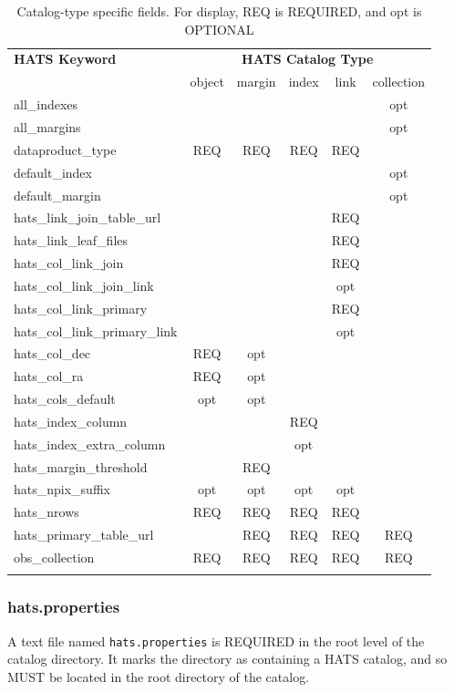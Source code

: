\documentclass[11pt,a4paper]{ivoa}
\begin{document}
\begin{table}[h!]
{\footnotesize\begin{tabular}{l c c c c c}
\sptablerule
\textbf{HATS Keyword} &\multicolumn{5}{c}{\textbf{HATS Catalog Type}} \\
\rowcolor{white}
& object & margin & index & link & collection \\
\sptablerule
all\_indexes & & & & &opt \\
all\_margins & & & & &opt \\
dataproduct\_type &REQ &REQ &REQ &REQ & \\
default\_index & & & & &opt \\
default\_margin & & & & &opt \\
hats\_link\_join\_table\_url & & & &REQ & \\
hats\_link\_leaf\_files & & & &REQ & \\
hats\_col\_link\_join & & & &REQ & \\
hats\_col\_link\_join\_link & & & &opt & \\
hats\_col\_link\_primary & & & &REQ & \\
hats\_col\_link\_primary\_link & & & &opt & \\
hats\_col\_dec &REQ &opt & & & \\
hats\_col\_ra &REQ &opt & & & \\
hats\_cols\_default &opt &opt & & & \\
hats\_index\_column & & &REQ & & \\
hats\_index\_extra\_column & & &opt & & \\
hats\_margin\_threshold & &REQ & & & \\
hats\_npix\_suffix &opt &opt &opt &opt & \\
hats\_nrows &REQ &REQ &REQ &REQ & \\
hats\_primary\_table\_url & &REQ &REQ &REQ &REQ \\
obs\_collection &REQ &REQ &REQ &REQ &REQ \\
\sptablerule
\end{tabular}}
\caption{Catalog-type specific fields. For display, REQ is REQUIRED, and opt is OPTIONAL}
\label{tab:propertyRequirements}
\end{table}
    
\subsubsection{hats.properties} 

A text file named \texttt{hats.properties} is REQUIRED in the root level of the catalog directory.
It marks the directory as containing a HATS catalog, and so MUST be located in the root directory of the catalog.
\end{document}
